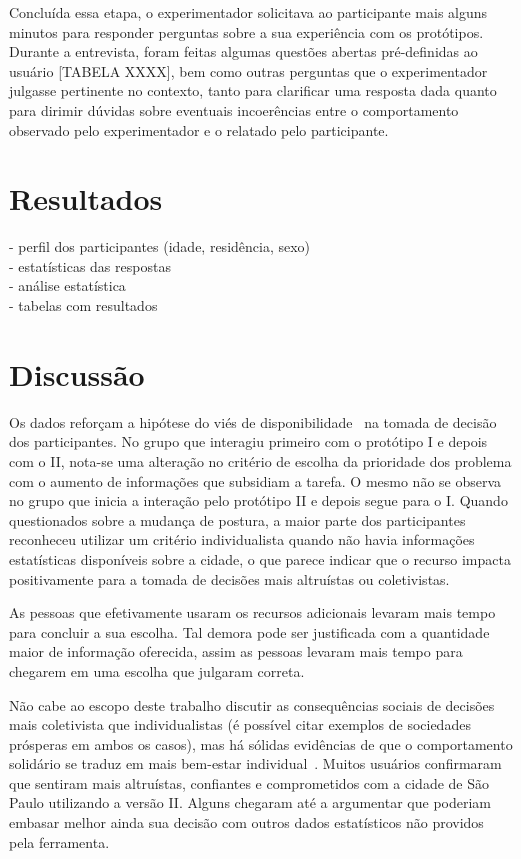 \documentclass{sigchi}
\begin{document}
Concluída essa etapa, o experimentador solicitava ao participante mais alguns minutos para responder perguntas sobre a sua experiência com os protótipos. Durante a entrevista, foram feitas algumas questões abertas pré-definidas ao usuário [TABELA XXXX], bem como outras perguntas que o experimentador julgasse pertinente no contexto, tanto para clarificar uma resposta dada quanto para dirimir dúvidas sobre eventuais incoerências entre o comportamento observado pelo experimentador e o relatado pelo participante.



\section{Resultados}
- perfil dos participantes (idade, residência, sexo)\\
- estatísticas das respostas\\
- análise estatística\\
- tabelas com resultados\\


\section{Discussão}
Os dados reforçam a hipótese do viés de disponibilidade~\cite{tversky:1973} na tomada de decisão dos participantes. No grupo que interagiu primeiro com o protótipo I e depois com o II, nota-se uma alteração no critério de escolha da prioridade dos problema com o aumento de informações que subsidiam a tarefa. O mesmo não se observa no grupo que inicia a interação pelo protótipo II e depois segue para o I. Quando questionados sobre a mudança de postura, a maior parte dos participantes reconheceu utilizar um critério individualista quando não havia informações estatísticas disponíveis sobre a cidade, o que parece indicar que o recurso impacta positivamente para a tomada de decisões mais altruístas ou coletivistas.

As pessoas que efetivamente usaram os recursos adicionais levaram mais tempo para concluir a sua escolha. Tal demora pode ser justificada com a quantidade maior de informação oferecida, assim as pessoas levaram mais tempo para chegarem em uma escolha que julgaram correta.

Não cabe ao escopo deste trabalho discutir as consequências sociais de decisões mais coletivista que individualistas (é possível citar exemplos de sociedades prósperas em ambos os casos), mas há sólidas evidências de que o comportamento solidário se traduz em mais bem-estar individual~\cite{thoits:2001}. Muitos usuários confirmaram que sentiram mais altruístas, confiantes e comprometidos com a cidade de São Paulo utilizando a versão II. Alguns chegaram até a argumentar que poderiam embasar melhor ainda sua decisão com outros dados estatísticos não providos pela ferramenta. 
\end{document}
